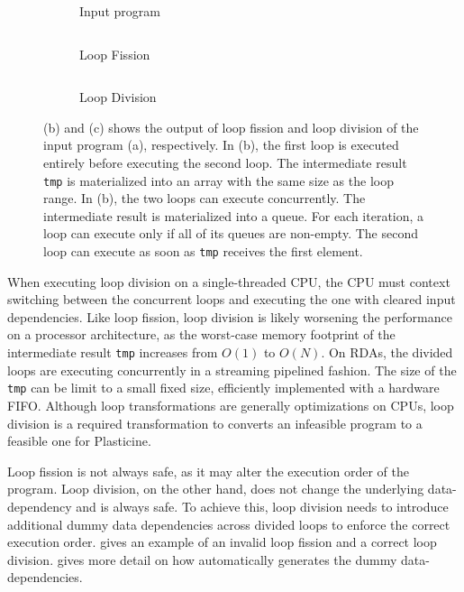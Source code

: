 \begin{figure}
\centering
\begin{subfigure}[b]{0.28\textwidth}
\inputminted{python}{code/loopexp1.py}
\caption{Input program}
\end{subfigure}
\hfill
\begin{subfigure}[b]{0.31\textwidth}
\inputminted{python}{code/loopexp1fission.py}
\caption{Loop Fission}
\end{subfigure}
\hfill
\begin{subfigure}[b]{0.32\textwidth}
\inputminted{python}{code/loopexp1division.py}
\caption{Loop Division}
\end{subfigure}
\caption[Example of loop fission vs. loop division]{
  (b) and (c) shows the output of loop fission and loop division of the input program (a), respectively.
  In (b), the first loop is executed entirely before executing the second loop. The intermediate
  result \texttt{tmp} is materialized into an array with the same size as the loop range.
  In (b), the two loops can execute concurrently. The intermediate result is materialized into a
  queue. For each iteration, a loop can execute only if all of its queues are non-empty.
  The second loop can execute as soon as \texttt{tmp} receives the first element.
}
\label{fig:loopexp1}
\end{figure}

When executing loop division on a single-threaded CPU, the CPU must context switching between the
concurrent loops
and executing the one with cleared input dependencies.
Like loop fission, loop division is likely worsening the performance on a processor architecture, as
the worst-case memory footprint of the intermediate result \texttt{tmp} increases from $O(1)$ to $O(N)$.
On RDAs, the divided loops are executing
concurrently in a streaming pipelined fashion. The size of the \texttt{tmp} can be limit to a small fixed
size, efficiently implemented with a hardware FIFO. 
Although loop transformations are generally optimizations on CPUs,
loop division is a required transformation to converts an infeasible program to a feasible one for Plasticine.

Loop fission is not always safe, as it may alter the execution order of the program.
Loop division, on the other hand, does not change the underlying data-dependency and is always safe.
To achieve this, loop division needs to introduce additional dummy data dependencies across divided
loops to enforce the correct execution order.
 gives an example of an invalid loop fission and a correct loop division.
 gives more detail on how \name automatically generates the dummy data-dependencies.

